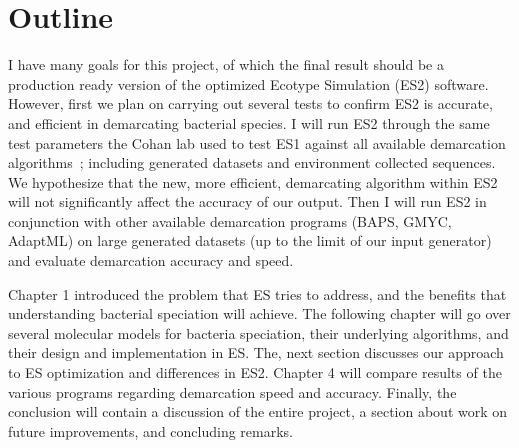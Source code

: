 \section{Outline}
I have many goals for this project, of which the final result should be a production ready version of the optimized Ecotype Simulation (ES2) software.
However, first we plan on carrying out several tests to confirm ES2 is accurate, and efficient in demarcating bacterial species.
I will run ES2 through the same test parameters the Cohan lab used to test ES1 against all available demarcation algorithms~\cite{carlo}; including generated datasets and environment collected sequences.
We hypothesize that the new, more efficient, demarcating algorithm within ES2 will not significantly affect the accuracy of our output.
Then I will run ES2 in conjunction with other available demarcation programs (BAPS, GMYC, AdaptML) on large generated datasets (up to the limit of our input generator) and evaluate demarcation accuracy and speed.

Chapter 1 introduced the problem that ES tries to address, and the benefits that understanding bacterial speciation will achieve.
The following chapter will go over several molecular models for bacteria speciation, their underlying algorithms, and their design and implementation in ES.
The, next section discusses our approach to ES optimization and differences in ES2.
Chapter 4 will compare results of the various programs regarding demarcation speed and accuracy.
Finally, the conclusion will contain a discussion of the entire project, a section about work on future improvements, and concluding remarks.

